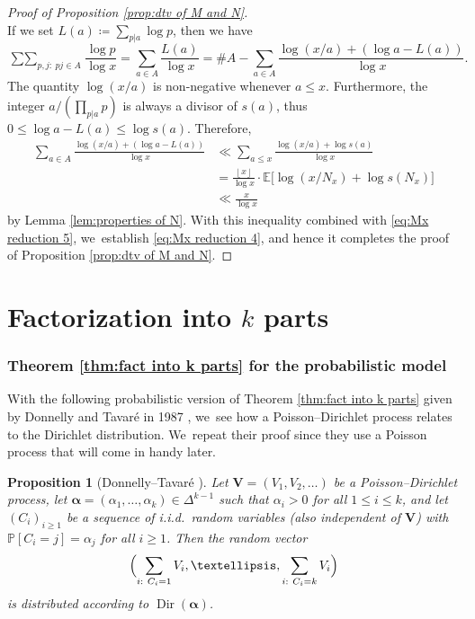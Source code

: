 \documentclass[10pt,a4paper]{amsart}
\newcommand{\bV}{{\boldsymbol V}}
\newcommand{\PP}{\mathbb{P}}
\newcommand{\EE}{\mathbb{E}}
\newcommand{\boldalpha}{\boldsymbol{\alpha}}
\newcommand{\floor}[1]{\left\lfloor #1 \right\rfloor}
\newcommand{\simplex}{\Delta^{k-1}}
\newcommand{\bg}{\big}
\DeclareMathOperator{\Dir}{Dir}
\theoremstyle{plain}
\newtheorem{prop}[cor]{Proposition}
\theoremstyle{definition}
\begin{document}
\begin{proof}[Proof of Proposition \ref{prop:dtv of M and N}]
\begin{equation}
\end{equation}
If we set $L(a)\coloneqq \sum_{p|a}\log p$, then we have
\begin{equation}
\label{eq:Mx reduction 5}
\mathop{\sum\sum}_{p,j:\ pj \in A} \frac{\log p}{\log x} = \sum_{a\in A}\frac{L(a)}{\log x} = \# A
- \sum_{a\in A} \frac{\log(x/a) + (\log a - L(a))}{\log x}.
\end{equation}
The quantity $\log(x/a)$ is non-negative whenever $a \le x$. Furthermore, the integer $a/(\prod_{p|a} p)$ is always a divisor of $s(a)$, thus $0 \le \log a - L(a) \le \log s(a)$. Therefore,
\begin{align*}
\sum_{a\in A} \frac{\log(x/a) + (\log a - L(a))}{\log x} &\ll \sum_{a\le x} \frac{\log(x/a) + \log s(a)}{\log x} \\
&= \frac{\floor x}{\log x} \cdot \EE\bg[\log(x/N_x) + \log s(N_x)\bg] \\
&\ll \frac{x}{\log x}
\end{align*}
by Lemma \ref{lem:properties of N}. With this inequality combined with \eqref{eq:Mx reduction 5}, we~establish \eqref{eq:Mx reduction 4}, and hence it completes the proof of Proposition \ref{prop:dtv of M and N}.
\end{proof}

\part{Factorization into \texorpdfstring{$k$}{k} parts}\label{part:DDT}

\section{Theorem \ref{thm:fact into k parts} for the probabilistic model}\label{sec:Donnelly-Tavare}

With the following probabilistic version of Theorem \ref{thm:fact into k parts} given by Donnelly and Tavaré in 1987 \cite[\S 3]{DonnellyTavare87}, we~see how a Poisson--Dirichlet process relates to the Dirichlet distribution. We~repeat their proof since they use a Poisson process that will come in handy later.

\begin{prop}[Donnelly--Tavaré \cite{DonnellyTavare87}]
\label{prop:probabilistic dirichlet law}
Let $\bV = (V_1, V_2, \ldots)$ be a Poisson--Dirichlet process, let $\boldalpha = (\alpha_1, \ldots, \alpha_k) \in \simplex$ such that $\alpha_i > 0$ for all $1 \le i \le k$, and let $(C_i)_{i \ge 1}$ be a sequence of i.i.d.~random variables (also independent of $\bV$) with $\PP[C_i = j] = \alpha_j$ for all $i \ge 1$. Then the random vector
\[
\Bigl(\sum_{i:\ C_i = 1} V_i, \ldots, \sum_{i:\ C_i = k} V_i\Bigr)
\]
is distributed according to $\Dir(\boldalpha)$.
\end{prop}
\end{document}
